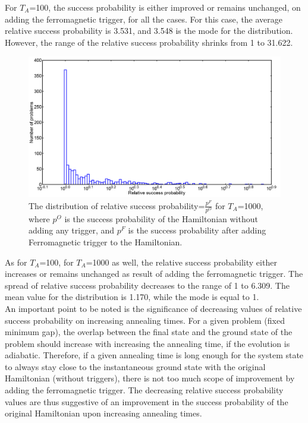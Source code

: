\documentclass[12]{article}
\begin{document}
For $T_A$=100, the success probability is either improved or remains unchanged, on adding the ferromagnetic trigger, for all the cases. For this case, the average relative success probability is 3.531, and 3.548 is the mode for the distribution. However, the range of the relative success probability shrinks from 1 to 31.622.
\begin{figure}[H]
\centering 
\includegraphics[scale=0.3]{Hist_s12_T1000_F_g0.png}
\caption{The distribution of relative success probability=$\frac{p^F}{p^O}$ for $T_A$=1000, where $p^O$ is the success probability of the Hamiltonian without adding any trigger, and $p^F$ is the success probability after adding Ferromagnetic trigger to the Hamiltonian.}
\label{fig:f6}
\end{figure}
As for $T_A$=100, for $T_A$=1000 as well, the relative success probability either increases or remains unchanged as result of adding the ferromagnetic trigger. The spread of relative success probability decreases to the range of 1 to 6.309. The mean value for the distribution is 1.170, while the mode is equal to 1. \\

An important point to be noted is the significance of decreasing values of relative success probability on increasing annealing times. For a given problem (fixed minimum gap), the overlap between the final state and the ground state of the problem should increase with increasing the annealing time, if the evolution is adiabatic. Therefore, if a given annealing time is long enough for the system state to always stay close to the instantaneous ground state with the original Hamiltonian (without triggers), there is not too much scope of improvement by adding the ferromagnetic trigger. The decreasing relative success probability values are thus suggestive of an improvement in the success probability of the original Hamiltonian upon increasing annealing times.\\
\end{document}
